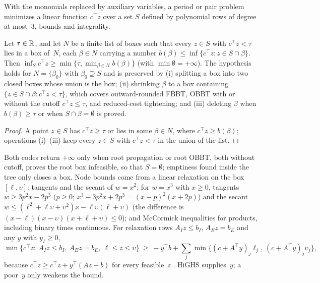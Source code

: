 With the monomials replaced by auxiliary variables, a period or pair problem minimizes a linear function $c^{\top}z$ over a set $S$ defined by polynomial rows of degree at most~3, bounds and integrality.

\begin{lemma}\label{lem:waterno2-bb}
Let $\tau\in\mathbb{R}$, and let $N$ be a finite list of boxes such that every $z\in S$ with $c^{\top}z<\tau$ lies in a box of~$N$, each $\beta\in N$ carrying a number $b(\beta)\le\inf\{c^{\top}z:z\in S\cap\beta\}$.
Then $\inf_Sc^{\top}z\ge\min\{\tau,\min_{\beta\in N}b(\beta)\}$ (with $\min\emptyset=+\infty$).
The hypothesis holds for $N=\{\beta_0\}$ with $\beta_0\supseteq S$ and is preserved by
(i) splitting a box into two closed boxes whose union is the box;
(ii) shrinking $\beta$ to a box containing $\{z\in S\cap\beta:c^{\top}z<\tau\}$, which covers outward-rounded FBBT, OBBT with or without the cutoff $c^{\top}z\le\tau$, and reduced-cost tightening; and
(iii) deleting $\beta$ when $b(\beta)\ge\tau$ or when $S\cap\beta=\emptyset$ is proved.
\end{lemma}

\begin{proof}
A point $z\in S$ has $c^{\top}z\ge\tau$ or lies in some $\beta\in N$, where $c^{\top}z\ge b(\beta)$; operations (i)--(iii) keep every $z\in S$ with $c^{\top}z<\tau$ in the union of the list.
\end{proof}

Both codes return $+\infty$ only when root propagation or root OBBT, both without cutoff, proves the root box infeasible, so that $S=\emptyset$; emptiness found inside the tree only closes a box.
Node bounds come from a linear relaxation on the box $[\ell,\upsilon]$: tangents and the secant of $w=x^2$; for $w=x^3$ with $x\ge0$, tangents $w\ge3p^2x-2p^3$ ($p\ge0$; $x^3-3p^2x+2p^3=(x-p)^2(x+2p)$) and the secant $w\le(\ell^2+\ell\upsilon+\upsilon^2)x-\ell\upsilon(\ell+\upsilon)$ (the difference is $(x-\ell)(x-\upsilon)(x+\ell+\upsilon)\le0$); and McCormick inequalities for products, including binary times continuous.
For relaxation rows $A_Iz\le b_I$, $A_Ez=b_E$ and any $y$ with $y_I\ge0$,
\begin{equation}\label{eq:waterno2-safe}
\min\{c^{\top}z:\ A_Iz\le b_I,\ A_Ez=b_E,\ \ell\le z\le\upsilon\}\ \ge\ -y^{\top}b+\sum_j\min\{(c+A^{\top}y)_j\ell_j,\ (c+A^{\top}y)_j\upsilon_j\},
\end{equation}
because $c^{\top}z\ge c^{\top}z+y^{\top}(Az-b)$ for every feasible~$z$ \citep{neumaier2004-safe-bounds-in-linear-and}.
HiGHS supplies~$y$; a poor~$y$ only weakens the bound.

